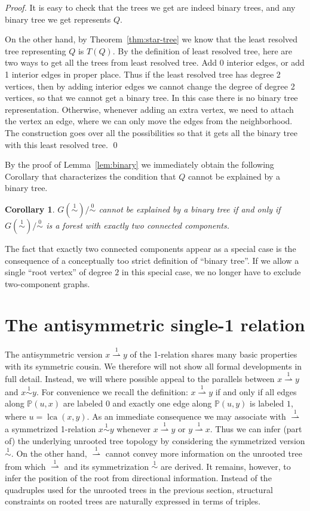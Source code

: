 \documentclass[smallextended]{svjour3}
\newcommand{\rev}[1]{\begingroup\color{blue}#1\endgroup}
\newcommand{\Ro}{\mathrel{\overset{0}{\sim}}}
\newcommand{\Rl}{\mathrel{\overset{1}{\sim}}}
\newcommand{\Rld}{\mathrel{\overset{1}{\rightharpoonup}}}
\newcommand{\lca}[1]{\mathop{lca}(#1)}
\newtheorem{cor}[thm]{Corollary}
\begin{document}
\begin{proof}
  It is easy to check that the trees we get are indeed binary trees, and
  any binary tree we get represents $Q$.
 
  On the other hand, by Theorem~\ref{thm:star-tree} we know that the least
  resolved tree representing $Q$ is $T(Q)$.  By the definition of least
  resolved tree, here are two ways to get all the trees from least resolved
  tree. Add 0 interior edges, or add 1 interior edges in proper place.
  Thus if the least resolved tree has degree 2 vertices, then by adding
  interior edges we cannot change the degree of degree 2 vertices, so that
  we cannot get a binary tree.  In this case there is no binary tree
  representation.  Otherwise, whenever adding an extra vertex, we need to
  attach the vertex an edge, where we can only move the edges from the
  neighborhood.  The construction goes over all the possibilities so that
  it gets all the binary tree with this least resolved tree. \qed
\end{proof}

By the proof of Lemma~\ref{lem:binary} we immediately obtain the following
Corollary that characterizes the condition that $Q$ cannot be explained by
a binary tree.
\begin{cor}
  $G(\Rl)/\Ro$ cannot be explained by a binary tree if and only if
  $G(\Rl)/\Ro$ \rev{is a forest with} exactly two connected components.
\end{cor}
The fact that exactly two connected components appear as a special case is
the consequence of a conceptually too strict definition of ``binary
tree''. If we allow a single ``root vertex'' of degree $2$ in this special
case, we no longer have to exclude two-component graphs.

\section{The antisymmetric single-1 relation}
\label{sect:1dir}

The antisymmetric version $x\Rld y$ of the 1-relation shares many basic
properties with its symmetric cousin. We therefore will not show all formal
developments in full detail. Instead, we will where possible appeal to the
parallels between $x\Rld y$ and $x\Rl y$. For convenience we recall the
definition: $x \Rld y$ if and only if all edges along $\mathbb{P}(u,x)$ are
labeled $0$ and exactly one edge along $\mathbb{P}(u,y)$ is labeled $1$,
where $u=\lca{x,y}$. As an immediate consequence we may associate with
$\Rld$ a symmetrized 1-relation $x\Rl y$ whenever $x\Rld y$ or $y\Rld
x$. Thus we can infer (part of) the underlying unrooted tree topology by
considering the symmetrized version $\Rl$. On the other hand, $\Rld$ cannot
convey more information on the unrooted tree from which $\Rld$ and its
symmetrization $\Rl$ are derived. It remains, however, to infer the
position of the root from directional information. Instead of the
quadruples used for the unrooted trees in the previous section, structural
constraints on rooted trees are naturally expressed in terms of triples.
\end{document}

